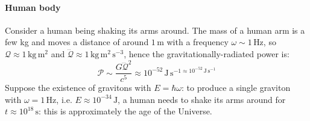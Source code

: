 \paragraph{Human body}

Consider a human being shaking its arms around. The mass of a human arm is a few kg and moves a distance of around $ 1\,\text{m} $ with a frequency $ \omega \sim 1\,\text{Hz} $, so $ \mathcal{Q} \approx 1\,\text{kg}\,\text{m}^2 $ and $ \dddot{\mathcal{Q}} \approx 1\,\text{kg}\,\text{m}^2\,\text{s}^{-3} $, hence the gravitationally-radiated power is:
\begin{equation*}
  \mathcal{P} \sim \frac{G \dddot{\mathcal{Q}}^2}{c^5} \approx 10^{-52}\,\text{J}\,\text{s}^{-1 \approx 10^{-52}\,\text{J}\,\text{s}^{-1}}
\end{equation*}
Suppose the existence of gravitons with $ E = \hbar\omega $: to produce a single graviton with $ \omega = 1\,\text{Hz} $, i.e. $ E \approx 10^{-34}\,\text{J} $, a human needs to shake its arms around for $ t \approx 10^{18}\,\text{s} $: this is approximately the age of the Universe.










